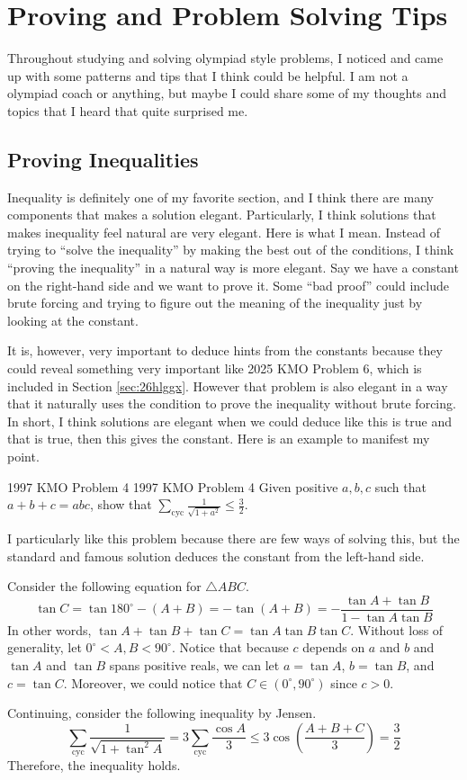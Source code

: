 \documentclass[../../../main.tex]{subfiles}
\begin{document}
\section{Proving and Problem Solving Tips}

Throughout studying and solving olympiad style problems, I noticed
and came up with some patterns and tips that I think could be
helpful. I am not a olympiad coach or anything, but maybe I could
share some of my thoughts and topics that I heard that quite
surprised me.

\subsection{Proving Inequalities}

Inequality is definitely one of my favorite section, and I think
there are many components that makes a solution elegant. Particularly,
I think solutions that makes inequality feel natural are very
elegant. Here is what I mean. Instead of trying to ``solve the
inequality'' by making the best out of the conditions, I think
``proving the inequality'' in a natural way is more elegant.
Say we have a constant on the right-hand side and we want to prove it.
Some ``bad proof'' could include brute forcing and trying to figure
out the meaning of the inequality just by looking at the constant.

It is, however, very important to deduce hints from the constants
because they could reveal something very important like 2025 KMO
Problem 6, which is included in Section \ref{sec:26hlggx}.
However that problem is also elegant in a way that it naturally uses
the condition to prove the inequality without brute forcing.
In short, I think solutions are elegant when we could deduce like
this is true and that is true, then this gives the constant.
Here is an example to manifest my point.

\begin{problem}{1997 KMO Problem 4 \easy}{1997 KMO Problem 4}
Given positive $a, b, c$ such that $a + b + c = abc$, show that
$\sum_\text{cyc} \frac{1}{\sqrt{1 + a^2}} \leq \frac{3}{2}$.
\end{problem}
\begin{solution}
I particularly like this problem because there are few ways of
solving this, but the standard and famous solution deduces the
constant from the left-hand side.

Consider the following equation for $\triangle{ABC}$.
\[
\tan C
= \tan{180^\circ - (A + B)}
= -\tan(A + B)
= - \frac{\tan A + \tan B}{1 - \tan A \tan B}
\]
In other words, $\tan A + \tan B + \tan C = \tan A \tan B \tan C$.
Without loss of generality, let $0^\circ < A, B < 90^\circ$.
Notice that because $c$ depends on $a$ and $b$ and $\tan A$ and
$\tan B$ spans positive reals, we can let $a = \tan A$, $b = \tan B$,
and $c = \tan C$. Moreover, we could notice that $C \in
(0^\circ, 90^\circ)$ since $c > 0$.

Continuing, consider the following inequality by Jensen.
\[
\sum_\text{cyc} \frac{1}{\sqrt{1 + \tan^2 A}}
= 3 \sum_\text{cyc} \frac{\cos A}{3}
\leq 3 \cos \left( \frac{A + B + C}{3} \right)
= \frac{3}{2}
\]
Therefore, the inequality holds.
\end{solution}
\end{document}
